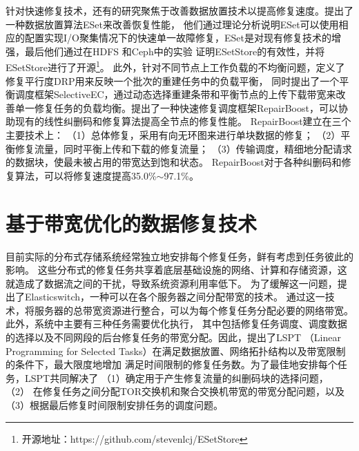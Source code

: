 针对快速修复技术，还有的研究聚焦于改善数据放置技术以提高修复速度。\citet{liu2020esetstore}提出了一种数据放置算法ESet来改善恢复性能，
他们通过理论分析说明ESet可以使用相应的配置实现I/O聚集情况下的快速单一故障修复，ESet是对现有修复技术的增强，最后他们通过在HDFS\cite{borthakur2008hdfs}
和Ceph\cite{weil2006ceph}中的实验
证明ESetStore的有效性，并将ESetStore进行了开源\footnote{开源地址：https://github.com/stevenlcj/ESetStore}。
此外，\citet{xu2020selectiveec}针对不同节点上工作负载的不均衡问题，定义了修复平行度DRP用来反映一个批次的重建任务中的负载平衡，
同时提出了一个平衡调度框架SelectiveEC，通过动态选择重建条带和平衡节点的上传下载带宽来改善单一修复任务的负载均衡。\citet{lin2021boosting}提出了一种快速修复调度框架RepairBoost，可以协助现有的线性纠删码和修复算法提高全节点的修复性能。
RepairBoost建立在三个主要技术上：
（1）总体修复，采用有向无环图来进行单块数据的修复；
（2）平衡修复流量，同时平衡上传和下载的修复流量；
（3）传输调度，精细地分配请求的数据块，使最未被占用的带宽达到饱和状态。
RepairBoost对于各种纠删码和修复算法，可以将修复速度提高35.0\%$\sim$97.1\%。

\section{基于带宽优化的数据修复技术}

目前实际的分布式存储系统经常独立地安排每个修复任务，鲜有考虑到任务彼此的影响。
这些分布式的修复任务共享着底层基础设施的网络、计算和存储资源，这就造成了数据流之间的干扰，导致系统资源利用率低下。
为了缓解这一问题，\citet{popa2013elasticswitch}提出了Elasticswitch，一种可以在各个服务器之间分配带宽的技术。
通过这一技术，将服务器的总带宽资源进行整合，可以为每个修复任务分配必要的网络带宽。此外，系统中主要有三种任务需要优化执行，
其中包括修复任务调度、调度数据的选择以及不同网段的后台修复任务的带宽分配。因此，\citet{li2018joint}提出了LSPT
（Linear Programming for Selected Tasks）在满足数据放置、网络拓扑结构以及带宽限制的条件下，最大限度地增加
满足时间限制的修复任务数。为了最佳地安排每个任务，LSPT共同解决了
（1）确定用于产生修复流量的纠删码块的选择问题，
（2） 在修复任务之间分配TOR交换机和聚合交换机带宽的带宽分配问题，以及
（3）根据最后修复时间限制安排任务的调度问题。

